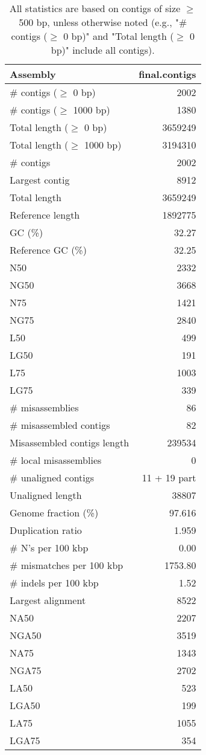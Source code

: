 \documentclass[12pt,a4paper]{article}
\begin{document}
\begin{table}[ht]
\begin{center}
\caption{All statistics are based on contigs of size $\geq$ 500 bp, unless otherwise noted (e.g., "\# contigs ($\geq$ 0 bp)" and "Total length ($\geq$ 0 bp)" include all contigs).}
\begin{tabular}{|l*{1}{|r}|}
\hline
Assembly & final.contigs \\ \hline
\# contigs ($\geq$ 0 bp) & 2002 \\ \hline
\# contigs ($\geq$ 1000 bp) & 1380 \\ \hline
Total length ($\geq$ 0 bp) & 3659249 \\ \hline
Total length ($\geq$ 1000 bp) & 3194310 \\ \hline
\# contigs & 2002 \\ \hline
Largest contig & 8912 \\ \hline
Total length & 3659249 \\ \hline
Reference length & 1892775 \\ \hline
GC (\%) & 32.27 \\ \hline
Reference GC (\%) & 32.25 \\ \hline
N50 & 2332 \\ \hline
NG50 & 3668 \\ \hline
N75 & 1421 \\ \hline
NG75 & 2840 \\ \hline
L50 & 499 \\ \hline
LG50 & 191 \\ \hline
L75 & 1003 \\ \hline
LG75 & 339 \\ \hline
\# misassemblies & 86 \\ \hline
\# misassembled contigs & 82 \\ \hline
Misassembled contigs length & 239534 \\ \hline
\# local misassemblies & 0 \\ \hline
\# unaligned contigs & 11 + 19 part \\ \hline
Unaligned length & 38807 \\ \hline
Genome fraction (\%) & 97.616 \\ \hline
Duplication ratio & 1.959 \\ \hline
\# N's per 100 kbp & 0.00 \\ \hline
\# mismatches per 100 kbp & 1753.80 \\ \hline
\# indels per 100 kbp & 1.52 \\ \hline
Largest alignment & 8522 \\ \hline
NA50 & 2207 \\ \hline
NGA50 & 3519 \\ \hline
NA75 & 1343 \\ \hline
NGA75 & 2702 \\ \hline
LA50 & 523 \\ \hline
LGA50 & 199 \\ \hline
LA75 & 1055 \\ \hline
LGA75 & 354 \\ \hline
\end{tabular}
\end{center}
\end{table}
\end{document}
